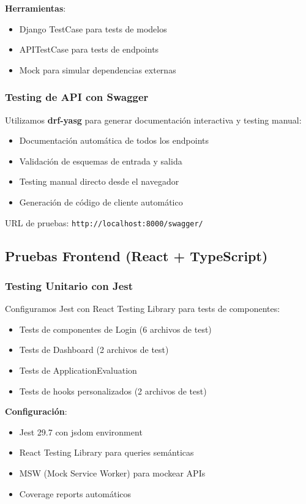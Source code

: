 \textbf{Herramientas}:
\begin{itemize}
    \item Django TestCase para tests de modelos
    \item APITestCase para tests de endpoints
    \item Mock para simular dependencias externas
\end{itemize}

\subsubsection{Testing de API con Swagger}

Utilizamos \textbf{drf-yasg} para generar documentación interactiva y testing manual:

\begin{itemize}
    \item Documentación automática de todos los endpoints
    \item Validación de esquemas de entrada y salida
    \item Testing manual directo desde el navegador
    \item Generación de código de cliente automático
\end{itemize}

URL de pruebas: \texttt{http://localhost:8000/swagger/}

\subsection{Pruebas Frontend (React + TypeScript)}

\subsubsection{Testing Unitario con Jest}

Configuramos Jest con React Testing Library para tests de componentes:

\begin{itemize}
    \item Tests de componentes de Login (6 archivos de test)
    \item Tests de Dashboard (2 archivos de test)
    \item Tests de ApplicationEvaluation
    \item Tests de hooks personalizados (2 archivos de test)
\end{itemize}

\textbf{Configuración}:
\begin{itemize}
    \item Jest 29.7 con jsdom environment
    \item React Testing Library para queries semánticas
    \item MSW (Mock Service Worker) para mockear APIs
    \item Coverage reports automáticos
\end{itemize}

